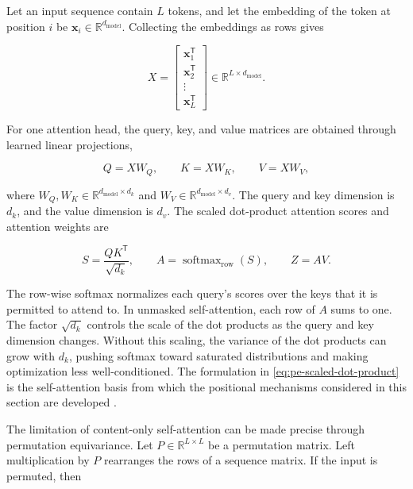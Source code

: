 Let an input sequence contain \(L\) tokens, and let the embedding of the
token at position \(i\) be \(\mathbf{x}_i\in\mathbb{R}^{d_{\mathrm{model}}}\).
Collecting the embeddings as rows gives

\begin{equation}
    X =
    \begin{bmatrix}
        \mathbf{x}_1^{\mathsf T}\\
        \mathbf{x}_2^{\mathsf T}\\
        \vdots\\
        \mathbf{x}_L^{\mathsf T}
    \end{bmatrix}
    \in\mathbb{R}^{L\times d_{\mathrm{model}}}.
    \label{eq:pe-input-matrix}
\end{equation}

For one attention head, the query, key, and value matrices are obtained
through learned linear projections,

\begin{equation}
    Q=XW_Q,\qquad
    K=XW_K,\qquad
    V=XW_V,
    \label{eq:pe-qkv-projections}
\end{equation}

where \(W_Q,W_K\in\mathbb{R}^{d_{\mathrm{model}}\times d_k}\) and
\(W_V\in\mathbb{R}^{d_{\mathrm{model}}\times d_v}\). The query and key
dimension is \(d_k\), and the value dimension is \(d_v\). The scaled
dot-product attention scores and attention weights are

\begin{equation}
    S=\frac{QK^{\mathsf T}}{\sqrt{d_k}},
    \qquad
    A=\operatorname{softmax}_{\mathrm{row}}(S),
    \qquad
    Z=AV.
    \label{eq:pe-scaled-dot-product}
\end{equation}

The row-wise softmax normalizes each query's scores over the keys that it is
permitted to attend to. In unmasked self-attention, each row of \(A\) sums
to one. The factor \(\sqrt{d_k}\) controls the scale of the dot products as
the query and key dimension changes. Without this scaling, the variance of
the dot products can grow with \(d_k\), pushing softmax toward saturated
distributions and making optimization less well-conditioned. The formulation
in \cref{eq:pe-scaled-dot-product} is the self-attention basis from which the
positional mechanisms considered in this section are developed
\parencite{zhou2024rethinking}.

The limitation of content-only self-attention can be made precise through
permutation equivariance. Let \(P\in\mathbb{R}^{L\times L}\) be a permutation
matrix. Left multiplication by \(P\) rearranges the rows of a sequence
matrix. If the input is permuted, then

